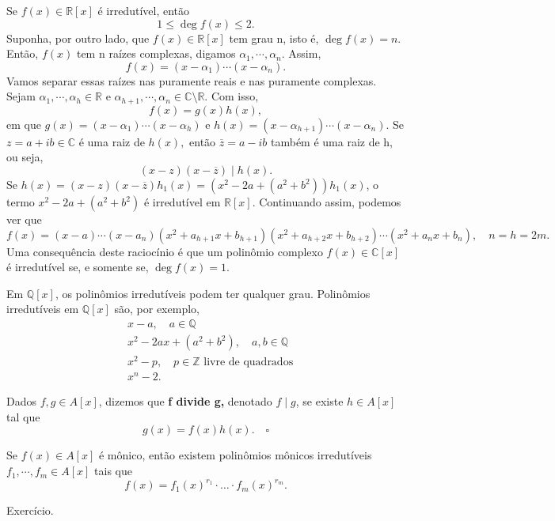 \documentclass[AlgebraII/algebraII_notes.tex]{subfiles}
\begin{document}
Se \(f(x)\in \mathbb{R}[x]\) é irredutível, então
\[
	1\leq \deg{f(x)}\leq 2.
\]
Suponha, por outro lado, que \(f(x)\in \mathbb{R}[x]\) tem grau n, isto é, \(\deg{f(x)} = n.\) Então, \(f(x)\) tem n raízes complexas,
digamos \(\alpha_{1}, \cdots, \alpha_{n}\). Assim,
\[
	f(x) = (x-\alpha_{1})\cdots(x-\alpha_{n}).
\]
Vamos separar essas raízes nas puramente reais e nas puramente complexas. Sejam \(\alpha_{1}, \cdots, \alpha_{h}\in \mathbb{R}\) e
\(\alpha_{h+1}, \cdots, \alpha_{n}\in \mathbb{C}\setminus{\mathbb{R}}.\) Com isso,
\[
	f(x) = g(x)h(x),
\]
em que \(g(x) = (x-\alpha_{1})\cdots(x-\alpha_{h})\) e \(h(x) = (x-\alpha_{h+1})\cdots(x-\alpha_{n}).\)
Se \(z = a + ib\in \mathbb{C}\) é uma raiz de \(h(x),\) então \(\overline{z} = a - ib\) também é uma raiz de h, ou seja,
\[
	(x-z)(x-\overline{z})\mid h(x).
\]
Se \(h(x) = (x-z)(x-\overline{z})h_{1}(x) = (x^{2}-2a + (a^{2}+b^{2}))h_{1}(x)\), o termo
\(x^{2}-2a + (a^{2}+b^{2})\) é irredutível em \(\mathbb{R}[x]\). Continuando assim, podemos ver que
\[
	f(x) = (x-a)\cdots(x-a_{n})(x^{2}+a_{h+1}x + b_{h+1})(x^{2}+a_{h+2}x+b_{h+2})\cdots(x^{2}+a_{n}x + b_{n}),\quad n = h = 2m.
\]
Uma consequência deste raciocínio é que um polinômio complexo \(f(x)\in \mathbb{C}[x]\) é irredutível se, e somente se, \(\deg{f(x)} = 1.\)
\begin{example}
	Em \(\mathbb{Q}[x]\), os polinômios irredutíveis podem ter qualquer grau. Polinômios irredutíveis em \(\mathbb{Q}[x]\)
	são, por exemplo,
	\begin{align*}
		 & x-a,\quad a\in \mathbb{Q}                                 \\
		 & x^{2}-2ax + (a^{2}+b^{2}),\quad a, b\in \mathbb{Q}        \\
		 & x^{2} - p,\quad p\in \mathbb{Z}\text{ livre de quadrados} \\
		 & x^{n} - 2.
	\end{align*}
\end{example}
\begin{def*}
	Dados \(f, g\in A[x]\), dizemos que \textbf{f divide g,} denotado \(f\mid g\), se existe \(h\in A[x]\) tal que
	\[
		g(x) = f(x)h(x).\quad\square
	\]
\end{def*}
\begin{lemma*}
	Se \(f(x)\in A[x]\) é mônico, então existem polinômios mônicos irredutíveis \(f_{1}, \cdots, f_{m}\in A[x]\) tais que
	\[
		f(x) = f_{1}(x)^{r_{1}}\cdot \dotsc \cdot f_{m}(x)^{r_{m}}.
	\]
\end{lemma*}
\begin{proof*}
	Exercício.
\end{proof*}
\end{document}
